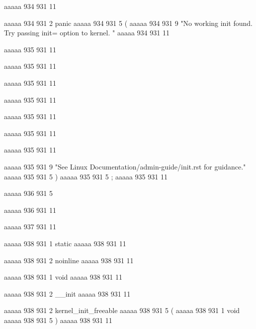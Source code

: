 {aaaaa 934 931
11
	
aaaaa 934 931
2
panic
aaaaa 934 931
5
(
aaaaa 934 931
9
"No working init found.  Try passing init= option to kernel. "
aaaaa 934 931
11


aaaaa 935 931
11
	
aaaaa 935 931
11
 
aaaaa 935 931
11
 
aaaaa 935 931
11
 
aaaaa 935 931
11
 
aaaaa 935 931
11
 
aaaaa 935 931
11
 
aaaaa 935 931
9
"See Linux Documentation/admin-guide/init.rst for guidance."
aaaaa 935 931
5
)
aaaaa 935 931
5
;
aaaaa 935 931
11


aaaaa 936 931
5
}
aaaaa 936 931
11


aaaaa 937 931
11


aaaaa 938 931
1
static
aaaaa 938 931
11
 
aaaaa 938 931
2
noinline
aaaaa 938 931
11
 
aaaaa 938 931
1
void
aaaaa 938 931
11
 
aaaaa 938 931
2
__init
aaaaa 938 931
11
 
aaaaa 938 931
2
kernel_init_freeable
aaaaa 938 931
5
(
aaaaa 938 931
1
void
aaaaa 938 931
5
)
aaaaa 938 931
11



